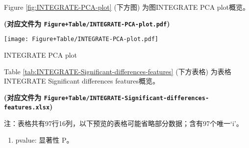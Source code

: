 \documentclass[
]{article}
\providecommand{\tightlist}{%
  \setlength{\itemsep}{0pt}\setlength{\parskip}{0pt}}
\begin{document}
\begin{center}\vspace{1.5cm}\end{center}

\begin{center}\vspace{1.5cm}\end{center}

Figure \ref{fig:INTEGRATE-PCA-plot} (下方图) 为图INTEGRATE PCA plot概览。

\textbf{(对应文件为 \texttt{Figure+Table/INTEGRATE-PCA-plot.pdf})}

\def\@captype{figure}
\begin{center}
\texttt{[image: Figure+Table/INTEGRATE-PCA-plot.pdf]}
\caption{INTEGRATE PCA plot}\label{fig:INTEGRATE-PCA-plot}
\end{center}

\begin{center}\vspace{1.5cm}\end{center}

\begin{center}\vspace{1.5cm}\end{center}

Table \ref{tab:INTEGRATE-Significant-differences-features} (下方表格) 为表格INTEGRATE Significant differences features概览。

\textbf{(对应文件为 \texttt{Figure+Table/INTEGRATE-Significant-differences-features.xlsx})}

\begin{center}\begin{tcolorbox}[colback=gray!10, colframe=gray!50, width=0.9\linewidth, arc=1mm, boxrule=0.5pt]注：表格共有97行16列，以下预览的表格可能省略部分数据；含有97个唯一`i'。
\end{tcolorbox}
\end{center}
\begin{center}\begin{tcolorbox}[colback=gray!10, colframe=gray!50, width=0.9\linewidth, arc=1mm, boxrule=0.5pt]\begin{enumerate}\tightlist
\item pvalue:  显著性 P。
\end{enumerate}\end{tcolorbox}
\end{center}
\end{document}
